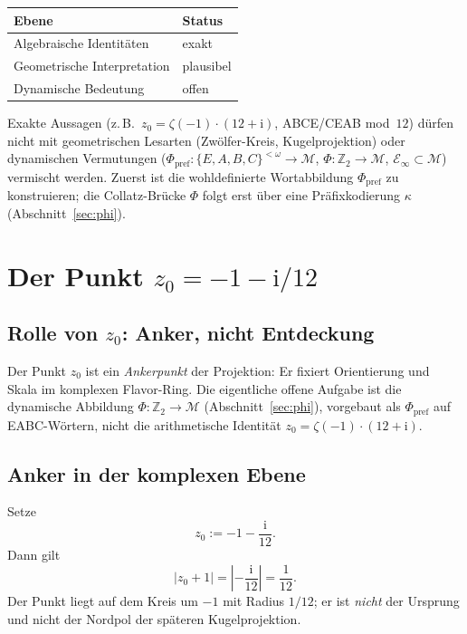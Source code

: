 \documentclass[11pt,a4paper]{article}
\theoremstyle{definition}
\theoremstyle{remark}
\newcommand{\Ztwo}{\mathbb{Z}_2}
\newcommand{\SigmaEABC}{\{E,A,B,C\}}
\newcommand{\Phpref}{\Phi_{\mathrm{pref}}}
\begin{document}
\begin{center}
  \begin{tabular}{@{}ll@{}}
    \toprule
    Ebene & Status \\
    \midrule
    Algebraische Identitäten & exakt \\
    Geometrische Interpretation & plausibel \\
    Dynamische Bedeutung & offen \\
    \bottomrule
  \end{tabular}
\end{center}

\noindent
Exakte Aussagen (z.\,B.\ $z_0=\zeta(-1)\cdot(12+\mathrm{i})$,
ABCE/CEAB mod~$12$) dürfen nicht mit geometrischen Lesarten
(Zwölfer-Kreis, Kugelprojektion) oder dynamischen Vermutungen
($\Phpref:\SigmaEABC^{<\omega}\to\mathcal{M}$,
$\Phi:\Ztwo\to\mathcal{M}$, $\mathcal{E}_\infty\subset\mathcal{M}$)
vermischt werden. Zuerst ist die wohldefinierte Wortabbildung
$\Phpref$ zu konstruieren; die Collatz-Brücke $\Phi$ folgt erst
über eine Präfixkodierung $\kappa$ (Abschnitt~\ref{sec:phi}).

\section{Der Punkt \texorpdfstring{$z_0=-1-\mathrm{i}/12$}{z0=-1-i/12}}

\subsection{Rolle von \texorpdfstring{$z_0$}{z0}: Anker, nicht Entdeckung}

Der Punkt $z_0$ ist ein \emph{Ankerpunkt} der Projektion: Er fixiert
Orientierung und Skala im komplexen Flavor-Ring. Die eigentliche
offene Aufgabe ist die dynamische Abbildung $\Phi:\Ztwo\to\mathcal{M}$
(Abschnitt~\ref{sec:phi}), vorgebaut als $\Phpref$ auf EABC-Wörtern,
nicht die arithmetische Identität
$z_0=\zeta(-1)\cdot(12+\mathrm{i})$.

\subsection{Anker in der komplexen Ebene}

Setze
\[
z_0 := -1 - \frac{\mathrm{i}}{12}.
\]
Dann gilt
\[
|z_0+1| = \left|-\frac{\mathrm{i}}{12}\right| = \frac{1}{12}.
\]
Der Punkt liegt auf dem Kreis um $-1$ mit Radius $1/12$; er ist
\emph{nicht} der Ursprung und nicht der Nordpol der späteren
Kugelprojektion.
\end{document}
